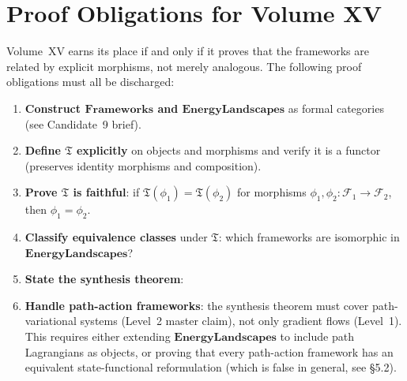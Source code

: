 \documentclass[11pt, a4paper]{book}
\theoremstyle{flyxion}
\theoremstyle{remark}
\begin{document}
\section{Proof Obligations for Volume XV}

Volume~XV earns its place if and only if it proves that the
frameworks are related by explicit morphisms, not merely
analogous. The following proof obligations must all be discharged:

\medskip
\begin{enumerate}[leftmargin=1.5em]
\item \textbf{Construct $\mathbf{Frameworks}$ and
  $\mathbf{EnergyLandscapes}$} as formal categories (see
  Candidate~9 brief).

\item \textbf{Define $\mathfrak{T}$ explicitly} on objects and
  morphisms and verify it is a functor (preserves identity
  morphisms and composition).

\item \textbf{Prove $\mathfrak{T}$ is faithful}: if
  $\mathfrak{T}(\phi_1) = \mathfrak{T}(\phi_2)$ for morphisms
  $\phi_1, \phi_2: \mathcal{F}_1 \to \mathcal{F}_2$, then
  $\phi_1 = \phi_2$.

\item \textbf{Classify equivalence classes} under $\mathfrak{T}$:
  which frameworks are isomorphic in $\mathbf{EnergyLandscapes}$?

\item \textbf{State the synthesis theorem}:

\begin{center}
\end{center}

\item \textbf{Handle path-action frameworks}: the synthesis theorem
  must cover path-variational systems (Level~2 master claim), not
  only gradient flows (Level~1). This requires either extending
  $\mathbf{EnergyLandscapes}$ to include path Lagrangians as
  objects, or proving that every path-action framework has an
  equivalent state-functional reformulation (which is false in
  general, see §5.2).
\end{enumerate}
\end{document}
